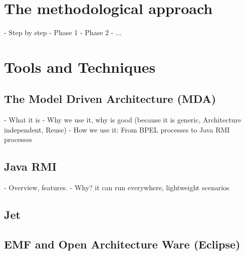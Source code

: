 
\section{The methodological approach}
- Step by step \nl
- Phase 1 \nl
- Phase 2 \nl 
- ... \nl





\section{Tools and Techniques}


\subsection{The Model Driven Architecture (MDA)}
- What it is \nl
- Why we use it, why is good (because it is generic, Architecture independent, Reuse)  \nl
- How we use it: From BPEL processes to Java RMI processes \nl
\subsection{Java RMI}
- Overview, features.
- Why? it can run everywhere, lightweight scenarios  \nl
\subsection{Jet}
\subsection{EMF and Open Architecture Ware (Eclipse)}
